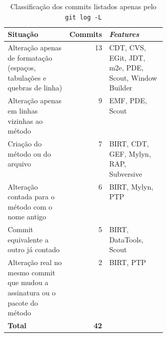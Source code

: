 \begin{table}[htbp]
    \centering
    \footnotesize
    \renewcommand{\arraystretch}{1.2}
    \caption{Classificação dos commits listados apenas pelo \texttt{git log -L}}
    \label{tab:ap-gitonly}
    \begin{tabularx}{\linewidth}{@{}>{\raggedright\arraybackslash}Xr>{\raggedright\arraybackslash}p{0.36\linewidth}@{}}
        \toprule
        Situação & Commits & \textit{Features} \\
        \midrule
        Alteração apenas de formatação (espaços, tabulações e quebras de linha) & 13 & CDT, CVS, EGit, JDT, m2e, PDE, Scout, Window Builder \\
        Alteração apenas em linhas vizinhas ao método & 9 & EMF, PDE, Scout \\
        Criação do método ou do arquivo & 7 & BIRT, CDT, GEF, Mylyn, RAP, Subversive \\
        Alteração contada para o método com o nome antigo & 6 & BIRT, Mylyn, PTP \\
        Commit equivalente a outro já contado & 5 & BIRT, DataTools, Scout \\
        Alteração real no mesmo commit que mudou a assinatura ou o pacote do método & 2 & BIRT, PTP \\
        \midrule
        \textbf{Total} & \textbf{42} & \\
        \bottomrule
    \end{tabularx}
\end{table}%
